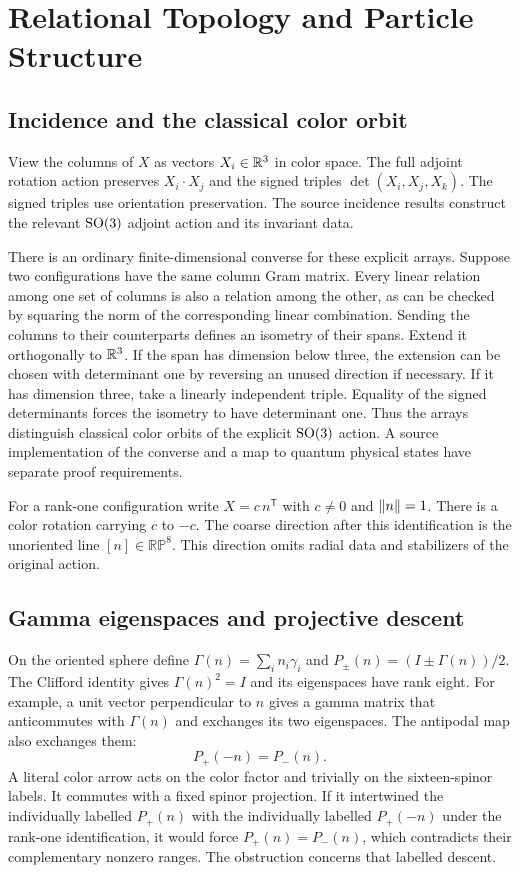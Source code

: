\chapter{Relational Topology and Particle Structure}\label{ch:topology}

\section{Incidence and the classical color orbit}
View the columns of $X$ as vectors $X_i\in\mathbb R^3$ in color space. The full adjoint rotation action preserves $X_i\cdot X_j$ and the signed triples $\det(X_i,X_j,X_k)$. The signed triples use orientation preservation. The source incidence results construct the relevant $\operatorname{SO}(3)$ adjoint action and its invariant data.

There is an ordinary finite-dimensional converse for these explicit arrays. Suppose two configurations have the same column Gram matrix. Every linear relation among one set of columns is also a relation among the other, as can be checked by squaring the norm of the corresponding linear combination. Sending the columns to their counterparts defines an isometry of their spans. Extend it orthogonally to $\mathbb R^3$. If the span has dimension below three, the extension can be chosen with determinant one by reversing an unused direction if necessary. If it has dimension three, take a linearly independent triple. Equality of the signed determinants forces the isometry to have determinant one. Thus the arrays distinguish classical color orbits of the explicit $\operatorname{SO}(3)$ action. A source implementation of the converse and a map to quantum physical states have separate proof requirements.

For a rank-one configuration write $X=c\,n^{\mathsf T}$ with $c\ne0$ and $\lVert n\rVert=1$. There is a color rotation carrying $c$ to $-c$. The coarse direction after this identification is the unoriented line $[n]\in\mathbb{RP}^8$. This direction omits radial data and stabilizers of the original action.

\section{Gamma eigenspaces and projective descent}
On the oriented sphere define $\Gamma(n)=\sum_i n_i\gamma_i$ and $P_\pm(n)=(I\pm\Gamma(n))/2$. The Clifford identity gives $\Gamma(n)^2=I$ and its eigenspaces have rank eight. For example, a unit vector perpendicular to $n$ gives a gamma matrix that anticommutes with $\Gamma(n)$ and exchanges its two eigenspaces. The antipodal map also exchanges them:
\[
 P_+(-n)=P_-(n).
\]
A literal color arrow acts on the color factor and trivially on the sixteen-spinor labels. It commutes with a fixed spinor projection. If it intertwined the individually labelled $P_+(n)$ with the individually labelled $P_+(-n)$ under the rank-one identification, it would force $P_+(n)=P_-(n)$, which contradicts their complementary nonzero ranges. The obstruction concerns that labelled descent.

